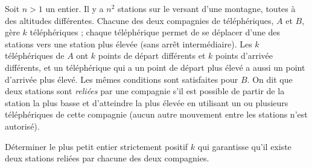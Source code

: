 Soit $n > 1$ un entier. Il y a $n^2$ stations sur le versant d'une montagne,
toutes à des altitudes différentes. Chacune des deux compagnies de
téléphériques, $A$ et $B$, gère $k$ téléphériques ; chaque téléphérique
permet de se déplacer d'une des stations vers une station plus élevée (sans
arrêt intermédiaire). Les $k$ téléphériques de $A$ ont $k$ points de départ
différents et $k$ points d'arrivée différents, et un téléphérique qui a un
point de départ plus élevé a aussi un point d'arrivée plus élevé. Les mêmes
conditions sont satisfaites pour $B$. On dit que deux stations sont
\emph{reliées} par une compagnie s'il est possible de partir de la station la
plus basse et d'atteindre la plus élevée en utilisant un ou plusieurs
téléphériques de cette compagnie (aucun autre mouvement entre les stations
n'est autorisé).

Déterminer le plus petit entier strictement positif $k$ qui garantisse qu'il
existe deux stations reliées par chacune des deux compagnies.
